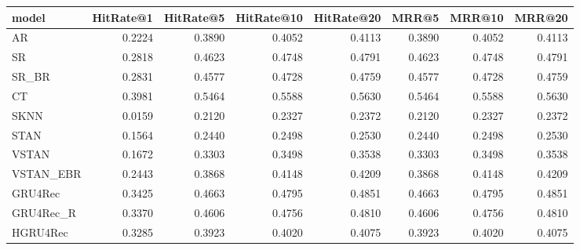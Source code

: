 \begin{tabular}{lrrrrrrr}
\toprule
     model &  HitRate@1 &  HitRate@5 &  HitRate@10 &  HitRate@20 &   MRR@5 &  MRR@10 &  MRR@20 \\
\midrule
        AR &     0.2224 &     0.3890 &      0.4052 &      0.4113 &  0.3890 &  0.4052 &  0.4113 \\
        SR &     0.2818 &     0.4623 &      0.4748 &      0.4791 &  0.4623 &  0.4748 &  0.4791 \\
     SR\_BR &     0.2831 &     0.4577 &      0.4728 &      0.4759 &  0.4577 &  0.4728 &  0.4759 \\
        CT &     0.3981 &     0.5464 &      0.5588 &      0.5630 &  0.5464 &  0.5588 &  0.5630 \\
      SKNN &     0.0159 &     0.2120 &      0.2327 &      0.2372 &  0.2120 &  0.2327 &  0.2372 \\
      STAN &     0.1564 &     0.2440 &      0.2498 &      0.2530 &  0.2440 &  0.2498 &  0.2530 \\
     VSTAN &     0.1672 &     0.3303 &      0.3498 &      0.3538 &  0.3303 &  0.3498 &  0.3538 \\
 VSTAN\_EBR &     0.2443 &     0.3868 &      0.4148 &      0.4209 &  0.3868 &  0.4148 &  0.4209 \\
   GRU4Rec &     0.3425 &     0.4663 &      0.4795 &      0.4851 &  0.4663 &  0.4795 &  0.4851 \\
 GRU4Rec\_R &     0.3370 &     0.4606 &      0.4756 &      0.4810 &  0.4606 &  0.4756 &  0.4810 \\
  HGRU4Rec &     0.3285 &     0.3923 &      0.4020 &      0.4075 &  0.3923 &  0.4020 &  0.4075 \\
\bottomrule
\end{tabular}
